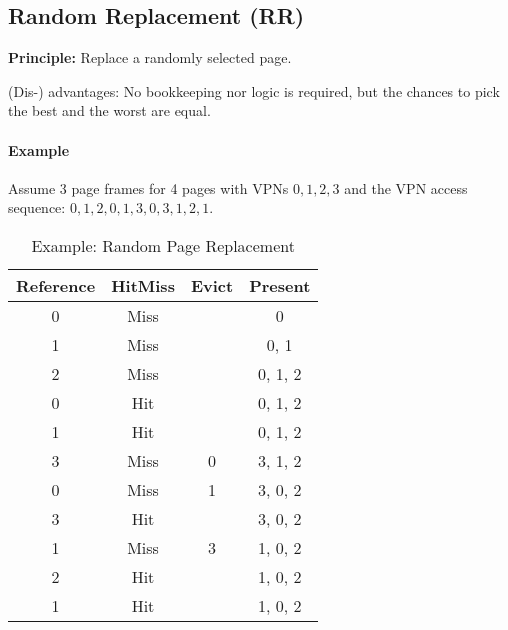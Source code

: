         \subsection{Random Replacement (RR)}
            \textbf{Principle:} Replace a randomly selected page.
            
            (Dis-) advantages: No bookkeeping nor logic is required, but the chances to pick the best and the worst are equal.
            
            \paragraph{Example}
                Assume 3 page frames for 4 pages with VPNs \( 0, 1, 2, 3 \) and the VPN access sequence: \( 0, 1, 2, 0, 1, 3, 0, 3, 1, 2, 1 \).
                \begin{table}[H]
                	\centering
                	\begin{tabular}{c|c|c|c}
                		\textbf{Reference} & \textbf{Hit}\textbf{Miss} & \textbf{Evict} & \textbf{Present} \\ \hline
                		        0          &           Miss            &                &        0         \\
                		        1          &           Miss            &                &       0, 1       \\
                		        2          &           Miss            &                &     0, 1, 2      \\
                		        0          &            Hit            &                &     0, 1, 2      \\
                		        1          &            Hit            &                &     0, 1, 2      \\
                		        3          &           Miss            &       0        &     3, 1, 2      \\
                		        0          &           Miss            &       1        &     3, 0, 2      \\
                		        3          &            Hit            &                &     3, 0, 2      \\
                		        1          &           Miss            &       3        &     1, 0, 2      \\
                		        2          &            Hit            &                &     1, 0, 2      \\
                		        1          &            Hit            &                &     1, 0, 2
                	\end{tabular}
                	\caption{Example: Random Page Replacement}
                \end{table}

